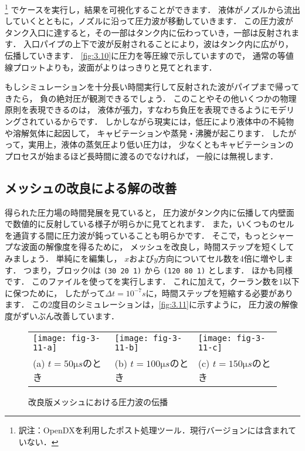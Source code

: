 %
\footnote{訳注：OpenDXを利用したポスト処理ツール．現行バージョンには含まれていない．}%
でケースを実行し，結果を可視化することができます．
液体がノズルから流出していくとともに，ノズルに沿って圧力波が移動していきます．
この圧力波がタンク入口に達すると，その一部はタンク内に伝わっていき，一部は反射されます．
入口パイプの上下で波が反射されることにより，波はタンク内に広がり，伝播していきます．
\autoref{fig:3.10}に圧力を等圧線で示していますので，
%
通常の等値線プロットよりも，波面がよりはっきりと見てとれます．

もしシミュレーションを十分長い時間実行して反射された波がパイプまで帰ってきたら，
負の絶対圧が観測できるでしょう．
このことやその他いくつかの物理原則を表現できるのは，
液体が張力，すなわち負圧を表現できるようにモデリングされているからです．
しかしながら現実には，低圧により液体中の不純物や溶解気体に起因して，
キャビテーションや蒸発・沸騰が起こります．
したがって，実用上，液体の蒸気圧より低い圧力は，
少なくともキャビテーションのプロセスが始まるほど長時間に渡るのでなければ，
一般には無視します．


\subsection{メッシュの改良による解の改善}
\label{ssec:3.4.5}
得られた圧力場の時間発展を見ていると，
圧力波がタンク内に伝播して内壁面で数値的に反射している様子が明らかに見てとれます．
また，いくつものセルを通貨する間に圧力波が鈍っていることも明らかです．
そこで，もっとシャープな波面の解像度を得るために，
メッシュを改良し，時間ステップを短くしてみましょう．
単純にを編集し，
$x$および$y$方向についてセル数を4倍に増やします．
つまり，ブロック0は \texttt{(30 20 1)} から \texttt{(120 80 1)} とします．
ほかも同様です．
このファイルを使ってを実行します．
これに加えて，クーラン数を$1$以下に保つために，
したがって$\Delta t = 10^{-7} \unit{s}$に，時間ステップを短縮する必要があります．
この2度目のシミュレーションは，\autoref{fig:3.11}に示すように，
圧力波の解像度がずいぶん改善しています．


\begin{figure}[ht]
 \tabcolsep=1pt
 \begin{tabular}{lll}
  \texttt{[image: fig-3-11-a]} &
  \texttt{[image: fig-3-11-b]} &
  \texttt{[image: fig-3-11-c]} \\
  (a) $t =  50 \unit{\micro s}$のとき &
  (b) $t = 100 \unit{\micro s}$のとき &
  (c) $t = 150 \unit{\micro s}$のとき
 \end{tabular}
 \caption{改良版メッシュにおける圧力波の伝播}
 \label{fig:3.11}
\end{figure}



